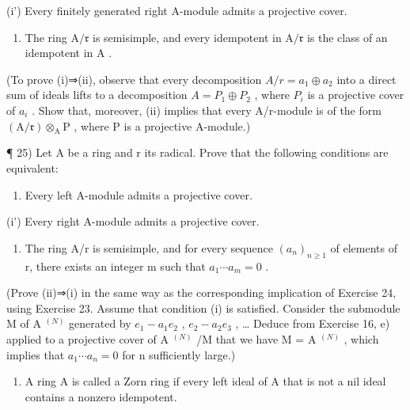 (i') Every finitely generated right A-module admits a projective cover.

\begin{enumerate}
\def\labelenumi{(\roman{enumi})}
\setcounter{enumi}{1}
\tightlist
\item
  The ring \(\mathrm{A} / \mathfrak{r}\) is semisimple, and every idempotent in \(\mathrm{A} / \mathfrak{r}\) is the class of an idempotent in \(\mathrm{A}\) .
\end{enumerate}

(To prove (i)⇒(ii), observe that every decomposition \(A/r = a_{1} \oplus a_{2}\) into a direct sum of ideals lifts to a decomposition \(A = P_{1} \oplus P_{2}\) , where \(P_{i}\) is a projective cover of \(a_{i}\) . Show that, moreover, (ii) implies that every A/r-module is of the form \((\mathrm{A}/\mathfrak{r}) \otimes_{\mathrm{A}} \mathrm{P}\) , where P is a projective A-module.)

¶ 25) Let A be a ring and r its radical. Prove that the following conditions are equivalent:

\begin{enumerate}
\def\labelenumi{(\roman{enumi})}
\tightlist
\item
  Every left A-module admits a projective cover.
\end{enumerate}

(i') Every right A-module admits a projective cover.

\begin{enumerate}
\def\labelenumi{(\roman{enumi})}
\setcounter{enumi}{1}
\tightlist
\item
  The ring A/r is semisimple, and for every sequence \((a_{n})_{n\geqslant1}\) of elements of r, there exists an integer m such that \(a_{1}\cdots a_{m}=0\) .
\end{enumerate}

(Prove (ii)⇒(i) in the same way as the corresponding implication of Exercise 24, using Exercise 23. Assume that condition (i) is satisfied. Consider the submodule M of A \(^{(N)}\) generated by \(e_1 - a_1e_2\) , \(e_2 - a_2e_3\) , \ldots{} Deduce from Exercise 16, e) applied to a projective cover of A \(^{(N)}\) /M that we have M = A \(^{(N)}\) , which implies that \(a_1 \cdots a_n = 0\) for n sufficiently large.)

\begin{enumerate}
\def\labelenumi{\arabic{enumi})}
\setcounter{enumi}{25}
\tightlist
\item
  A ring A is called a Zorn ring if every left ideal of A that is not a nil ideal contains a nonzero idempotent.
\end{enumerate}

